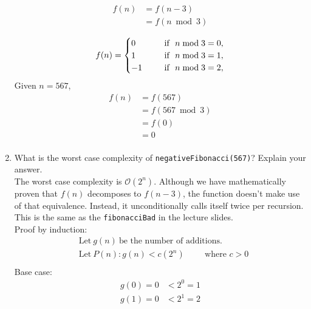 \begin{enumerate}
          \begin{align*}
              f(n) & =f(n-3)      \\
                   & =f(n\bmod 3) \\
          \end{align*}
          \begin{align*}
              f(n) & =
              \begin{cases}
                  0\hphantom{-\sqrt{-}} & \text{if \ } n\bmod 3=0, \\
                  1                     & \text{if \ } n\bmod 3=1, \\
                  -1                    & \text{if \ } n\bmod 3=2, \\
              \end{cases} \\
          \end{align*}
          Given $n=567$,
          \begin{align*}
              f(n) & =f(567)        \\
                   & =f(567\bmod 3) \\
                   & =f(0)          \\
                   & =0             \\
          \end{align*}
    \item What is the worst case complexity of \lstinline{negativeFibonacci(567)}? Explain your answer.\\
          The worst case complexity is $\mathcal{O}(2^n)$. Although we have mathematically proven that $f(n)$ decomposes to $f(n-3)$, the function doesn't make use of that equivalence. Instead, it unconditionally calls itself twice per recursion. This is the same as the \lstinline{fibonacciBad} in the lecture slides.\\
          Proof by induction:
          \begin{align*}
               & \text{Let}\ g(n) \ \text{be the number of additions.}       \\
               & \text{Let}\ P(n): g(n)<c(2^n) \hspace{1cm}\text{where } c>0 \\
          \end{align*}
          Base case:
          \begin{align*}
              g(0)=0             & <2^0=1   \\
              g(1)=0             & <2^1=2   \\

\end{align*}
\end{enumerate}
